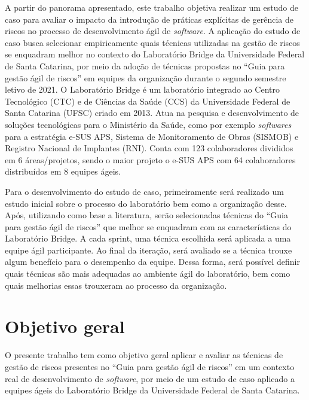 \documentclass[
    12pt,       %
    openright,      %
    twoside,      %
    a4paper,      %
    english,      %
    french,       %
    spanish,      %
    brazil,       %
    ]{abntex2}
\begin{document}
A partir do panorama apresentado, este trabalho objetiva realizar um estudo de caso para avaliar o impacto da introdução de práticas explícitas de gerência de riscos no processo de desenvolvimento ágil de \textit{software}. A aplicação do estudo de caso busca selecionar empiricamente quais técnicas utilizadas na gestão de riscos se enquadram melhor no contexto do Laboratório Bridge da Universidade Federal de Santa Catarina, por meio da adoção de técnicas propostas no “Guia para gestão ágil de riscos” \cite{Vieira:2020} em equipes da organização durante o segundo semestre letivo de 2021. O Laboratório Bridge é um laboratório integrado ao Centro Tecnológico (CTC) e de Ciências da Saúde (CCS) da Universidade Federal de Santa Catarina (UFSC) criado em 2013. Atua na pesquisa e desenvolvimento de soluções tecnológicas para o Ministério da Saúde, como por exemplo \textit{softwares} para a estratégia e-SUS APS, Sistema de Monitoramento de Obras (SISMOB) e Registro Nacional de Implantes (RNI). Conta com 123 colaboradores divididos em 6 áreas/projetos, sendo o maior projeto o e-SUS APS com 64 colaboradores distribuídos em 8 equipes ágeis.

Para o desenvolvimento do estudo de caso, primeiramente será realizado um estudo inicial sobre o processo do laboratório bem como a organização desse. Após, utilizando como base a literatura, serão selecionadas técnicas do “Guia para gestão ágil de riscos” \cite{Vieira:2020} que melhor se enquadram com as características do Laboratório Bridge. A cada sprint, uma técnica escolhida será aplicada a uma equipe ágil participante. Ao final da iteração, será avaliado se a técnica trouxe algum benefício para o desempenho da equipe. Dessa forma, será possível definir quais técnicas são mais adequadas ao ambiente ágil do laboratório, bem como quais melhorias essas trouxeram ao processo da organização.

\section{Objetivo geral}

O presente trabalho tem como objetivo geral aplicar e avaliar as técnicas de gestão de riscos presentes no “Guia para gestão ágil de riscos” \cite{Vieira:2020} em um contexto real de desenvolvimento de \textit{software}, por meio de um estudo de caso aplicado a equipes ágeis do Laboratório Bridge da Universidade Federal de Santa Catarina.
\end{document}
